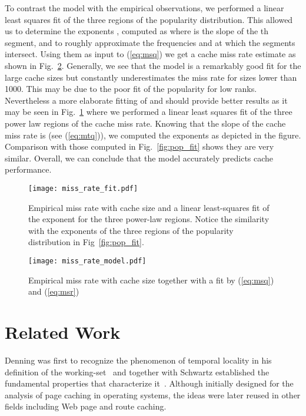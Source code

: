 \documentclass[twocolumn, 10pt]{article}
\theoremstyle{plain}
\begin{document}
To contrast the model with the empirical observations, we performed a linear
least squares fit of the three regions of the popularity distribution. This
allowed us to determine the exponents , computed as
 where  is the slope of the th segment,  and to
roughly approximate the frequencies  and  at which the
segments intersect. Using them as input to (\ref{eq:msq}) we get a cache miss
rate estimate as shown in Fig.~\ref{fig:mr_model}. Generally, we see that the
model is a remarkably good fit for the large cache sizes but constantly underestimates the
miss rate for sizes lower than 1000. This may be due to the
poor fit of the popularity for low ranks. Nevertheless a more elaborate fitting of
 and  should provide better results as it may be seen
in Fig.~\ref{fig:mr_fit} where we performed a linear least squares fit of the three
power law regions of the cache miss rate. Knowing that the slope of the cache
miss rate is  (see (\ref{eq:mtq})), we computed the
exponents as depicted in the figure. Comparison with those computed in
Fig.~\ref{fig:pop_fit} shows they are very similar. Overall, we can conclude
that the model accurately predicts cache performance. 

\begin{figure}[t]
    \centering
    \texttt{[image: miss\_rate\_fit.pdf]}
    \caption{Empirical miss rate with cache size and a linear least-squares
    fit of the exponent for the three power-law regions. Notice the
    similarity with the exponents of the three regions of the popularity
    distribution in Fig~\ref{fig:pop_fit}. }
    \label{fig:mr_fit}
\end{figure}

\begin{figure}[t]
    \centering
    \texttt{[image: miss\_rate\_model.pdf]}
    \caption{Empirical miss rate with cache size together with a fit by (\ref{eq:msq}) and
    (\ref{eq:msr})}
    \label{fig:mr_model}
\end{figure}
 
\section{Related Work}\label{sec:rw}
Denning was first to recognize the phenomenon of temporal locality in his
definition of the working-set~\cite{denning:ws_model} and together with
Schwartz established the fundamental properties that characterize
it~\cite{denning:ws_properties}. Although initially designed for the analysis
of page caching in operating systems, the ideas were later reused in other
fields including Web page and route caching.
\end{document}
